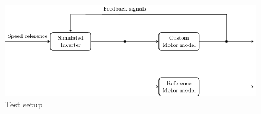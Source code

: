 \begin{figure}[htb]
\begingroup
\tikzset{}
 \centerline{\includegraphics[width=0.8\columnwidth]{.//Figure/tikz/test_setup.pdf}}
 \endgroup
 \caption{Test setup}
 \label{fig:test_setup}
\end{figure}